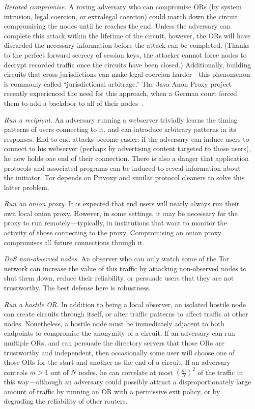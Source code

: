 \documentclass[twocolumn]{article}
\begin{document}
\emph{Iterated compromise.} A roving adversary who can
compromise ORs (by system intrusion, legal coercion, or extralegal
coercion) could march down the circuit compromising the
nodes until he reaches the end.  Unless the adversary can complete
this attack within the lifetime of the circuit, however, the ORs
will have discarded the necessary information before the attack can
be completed.  (Thanks to the perfect forward secrecy of session
keys, the attacker cannot force nodes to decrypt recorded
traffic once the circuits have been closed.)  Additionally, building
circuits that cross jurisdictions can make legal coercion
harder---this phenomenon is commonly called ``jurisdictional
arbitrage.'' The Java Anon Proxy project recently experienced the
need for this approach, when
a German court forced them to add a backdoor to
all of their nodes~\cite{jap-backdoor}.

\emph{Run a recipient.} An adversary running a webserver
trivially learns the timing patterns of users connecting to it, and
can introduce arbitrary patterns in its responses.
End-to-end attacks become easier: if the adversary can induce
users to connect to his webserver (perhaps by advertising
content targeted to those users), he now holds one end of their
connection.  There is also a danger that application
protocols and associated programs can be induced to reveal information
about the initiator. Tor depends on Privoxy and similar protocol cleaners
to solve this latter problem.

\emph{Run an onion proxy.} It is expected that end users will
nearly always run their own local onion proxy. However, in some
settings, it may be necessary for the proxy to run
remotely---typically, in institutions that want
to monitor the activity of those connecting to the proxy.
Compromising an onion proxy compromises all future connections
through it.

\emph{DoS non-observed nodes.} An observer who can only watch some
of the Tor network can increase the value of this traffic
by attacking non-observed nodes to shut them down, reduce
their reliability, or persuade users that they are not trustworthy.
The best defense here is robustness.

\emph{Run a hostile OR.}  In addition to being a local observer,
an isolated hostile node can create circuits through itself, or alter
traffic patterns to affect traffic at other nodes. Nonetheless, a hostile
node must be immediately adjacent to both endpoints to compromise the
anonymity of a circuit. If an adversary can
run multiple ORs, and can persuade the directory servers
that those ORs are trustworthy and independent, then occasionally
some user will choose one of those ORs for the start and another
as the end of a circuit. If an adversary
controls $m>1$ out of $N$ nodes, he can correlate at most
$\left(\frac{m}{N}\right)^2$ of the traffic in this way---although an
adversary
could possibly attract a disproportionately large amount of traffic
by running an OR with a permissive exit policy, or by
degrading the reliability of other routers.
\end{document}
